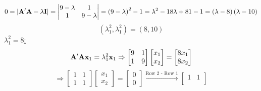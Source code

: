 \begin{enumerate}[label=(\alph*)]
            \[
                0 = \left|\bold{A}^\prime\bold{A} - \lambda\bold{I}\right|
                =
                \left|
                \begin{matrix}
                    9 - \lambda & 1 \\
                    1 & 9 - \lambda
                \end{matrix}
                \right|
                =
                {\left(9 - \lambda\right)}^2 - 1
                =
                \lambda^2 - 18\lambda + 81 - 1
                = \left(\lambda - 8\right)\left(\lambda - 10\right)
            \]
            \[
                \left(\lambda_1^2, \lambda_1^2\right)
                =
                \left(8, 10\right)
            \]
            \underline{$\lambda_1^2 = 8$:}
            \[
                \bold{A}^\prime\bold{A}\bold{x}_1=\lambda_1^2\bold{x}_1
                \Rightarrow
                \begin{bmatrix}
                    9 & 1 \\
                    1 & 9
                \end{bmatrix}
                \begin{bmatrix}
                    x_1 \\
                    x_2
                \end{bmatrix}
                =
                \begin{bmatrix}
                    8x_1 \\
                    8x_2
                \end{bmatrix}
            \]
            \[
                \Rightarrow
                \begin{bmatrix}
                    1 & 1 \\
                    1 & 1
                \end{bmatrix}
                \begin{bmatrix}
                    x_1 \\
                    x_2
                \end{bmatrix}
                =
                \begin{bmatrix}
                    0 \\
                    0
                \end{bmatrix}
                \overset{\text{Row 2 - Row 1}}{\longrightarrow}
                \begin{bmatrix}
                    1 & 1 \\

\end{bmatrix}\]
\end{enumerate}
